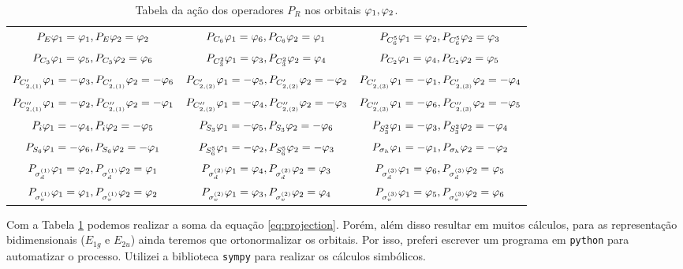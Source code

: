 \documentclass[a4paper,10pt]{article}
\newcommand{\python}[1]{\texttt{#1}}
\begin{document}
\begin{table}[H]
\caption{Tabela da ação dos operadores $P_R$ nos orbitais $\varphi_1, \varphi_2$.}
\centering
\footnotesize

\begin{tabular} { | c c c | }
\hline
$P_{E} \varphi_1 =  \varphi_1, P_{E} \varphi_2 =   \varphi_2$ & $P_{C_6} \varphi_1 =  \varphi_6, P_{C_6} \varphi_2 =   \varphi_1$ & $P_{C_6^5} \varphi_1 =  \varphi_2, P_{C_6^5} \varphi_2 =   \varphi_3$ \\
$P_{C_3} \varphi_1 =  \varphi_5, P_{C_3} \varphi_2 =   \varphi_6$ & $P_{C_3^2} \varphi_1 =  \varphi_3, P_{C_3^2} \varphi_2 =   \varphi_4$ & $P_{C_2} \varphi_1 =  \varphi_4, P_{C_2} \varphi_2 =   \varphi_5$ \\
$P_{C_{2,(1)}'} \varphi_1 = -\varphi_3, P_{C_{2,(1)}'} \varphi_2 = - \varphi_6$ & $P_{C_{2,(2)}'} \varphi_1 = -\varphi_5, P_{C_{2,(2)}'} \varphi_2 = - \varphi_2$ & $P_{C_{2,(3)}'} \varphi_1 = -\varphi_1, P_{C_{2,(3)}'} \varphi_2 = - \varphi_4$ \\
$P_{C_{2,(1)}''} \varphi_1 = -\varphi_2, P_{C_{2,(1)}''} \varphi_2 = - \varphi_1$ & $P_{C_{2,(2)}''} \varphi_1 = -\varphi_4, P_{C_{2,(2)}''} \varphi_2 = - \varphi_3$ & $P_{C_{2,(3)}''} \varphi_1 = -\varphi_6, P_{C_{2,(3)}''} \varphi_2 = - \varphi_5$ \\
$P_{i} \varphi_1 = -\varphi_4, P_{i} \varphi_2 = - \varphi_5$ & $P_{S_3} \varphi_1 = -\varphi_5, P_{S_3} \varphi_2 = - \varphi_6$ & $P_{S_3^2} \varphi_1 = -\varphi_3, P_{S_3^2} \varphi_2 = - \varphi_4$  \\
$P_{S_6} \varphi_1 = -\varphi_6, P_{S_6} \varphi_2 = - \varphi_1$ & $P_{S_6^5} \varphi_1 = -\varphi_2, P_{S_6^5} \varphi_2 = - \varphi_3$ & $P_{\sigma_h} \varphi_1 = -\varphi_1, P_{\sigma_h} \varphi_2 = - \varphi_2$ \\
$P_{\sigma_d^{(1)}} \varphi_1 =  \varphi_2, P_{\sigma_d^{(1)}} \varphi_2 =   \varphi_1$ & $P_{\sigma_d^{(2)}} \varphi_1 =  \varphi_4, P_{\sigma_d^{(2)}} \varphi_2 =   \varphi_3$ & $P_{\sigma_d^{(3)}} \varphi_1 =  \varphi_6, P_{\sigma_d^{(3)}} \varphi_2 =   \varphi_5$ \\
$P_{\sigma_v^{(1)}} \varphi_1 =  \varphi_1, P_{\sigma_v^{(1)}} \varphi_2 =   \varphi_2$ & $P_{\sigma_v^{(2)}} \varphi_1 =  \varphi_3, P_{\sigma_v^{(2)}} \varphi_2 =   \varphi_4$ & $P_{\sigma_v^{(3)}} \varphi_1 =  \varphi_5, P_{\sigma_v^{(3)}} \varphi_2 =   \varphi_6$ \\
\hline
\end{tabular}

\label{tab:proj}
\end{table}

Com a Tabela \ref{tab:proj} podemos realizar a soma da equação \ref{eq:projection}. Porém, além disso resultar em muitos cálculos, para as representação bidimensionais ($E_{1g}$ e $E_{2u}$) ainda teremos que ortonormalizar os orbitais. Por isso, preferi escrever um programa em \python{python} para automatizar o processo. Utilizei a biblioteca \python{sympy} para realizar os cálculos simbólicos.
\end{document}
